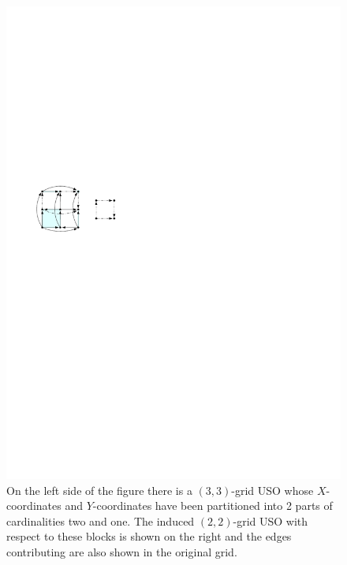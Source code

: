 \documentclass[runningheads,a4paper]{llncs}
\begin{document}
  \begin{figure}[htbp] 
  	\centering
  	\includegraphics[scale=1.5]{induced_orientation_ex.pdf}
  	\caption{\small On the left side of the figure there is a $(3,3)$-grid USO whose $X$-coordinates and $Y$-coordinates have been partitioned into 2 parts of cardinalities two and one. The induced $(2,2)$-grid USO with respect to these blocks is shown on the right and the edges contributing are also shown in the original grid.} 
  	\label{fig:example_induced_orientation}
  \end{figure}
\end{document}
